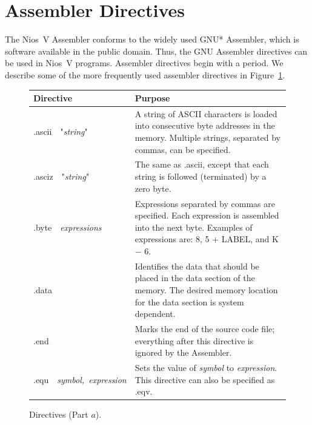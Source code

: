\documentclass[11pt, twoside, pdftex]{article}
\begin{document}
\section{Assembler Directives}

The Nios~V Assembler conforms to the widely used GNU* Assembler, which is 
software available in the public domain. Thus, the GNU Assembler directives can
be used in Nios~V programs. Assembler directives begin with a period. 
We describe some of the more frequently used assembler directives in
Figure~\ref{fig:directives}.

\begin{figure}[H]
\begin{center}
\begin{tabular}{p{.22\linewidth}|p{.7\linewidth}}
{\bf Directive} & {\bf Purpose} \\ \hline
\rule[-0.075in]{0in}{0.25in}{\sf .ascii}~~"{\it string}" & A string of ASCII characters is 
loaded into consecutive byte addresses in the memory.  Multiple strings, separated by commas, 
can be specified.\\
\rule[-0.075in]{0in}{0.33in}{\sf .asciz}~~"{\it string}" & The same as {\sf .ascii}, except 
that each string is followed (terminated) by a zero byte.\\
\rule[-0.075in]{0in}{0.33in}{\sf .byte}~~{\it expressions} & 
Expressions separated by commas are specified. Each expression is assembled into
the next byte. Examples of expressions are: 8, 5 + LABEL, and K $-$ 6.\\
\rule[-0.075in]{0in}{0.33in}{\sf .data} & Identifies the data that should be placed in the 
data section of the memory. The desired memory location for the data section is system dependent.\\
\rule[-0.075in]{0in}{0.33in}{\sf .end} & 
Marks the end of the source code file; everything after this
directive is ignored by the Assembler.\\
\rule[-0.075in]{0in}{0.33in}{\sf .equ}~~{\it symbol,~expression} &
Sets the value of {\it symbol} to {\it expression}. This directive can also be specified
as {\sf .eqv}.\\
\end{tabular}
\end{center}
	\caption{Directives (Part $a$).}
	\label{fig:directives}
\end{figure}
\end{document}
